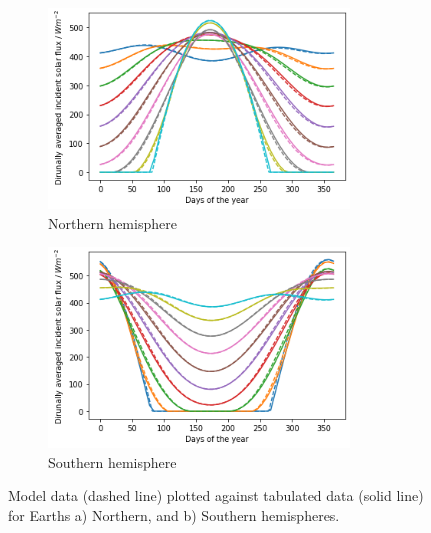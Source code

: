 \documentclass[12pt,onecolumn]{revtex4-2}    %
\begin{document}
\begin{figure}
\begin{subfigure}{.5\textwidth}
  \centering
  \includegraphics[width = 8cm]{EarthNorthFlux.png}
  \caption{Northern hemisphere}
  \label{fig:sub1}
\end{subfigure}%
\begin{subfigure}{.5\textwidth}
  \centering
  \includegraphics[width=8cm]{EarthSouthFlux.png}
  \caption{Southern hemisphere}
  \label{fig:sub2}
\end{subfigure}
\raggedright
\caption{Model data (dashed line) plotted against tabulated data (solid line) for Earths a) Northern, and b) Southern hemispheres.}
\label{fig:test}
\end{figure}
\end{document}
